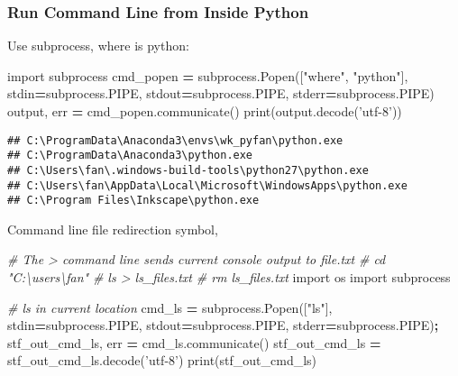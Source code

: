 \documentclass[
]{book}
\newenvironment{Shaded}{\begin{snugshade}}{\end{snugshade}}
\newcommand{\BuiltInTok}[1]{#1}
\newcommand{\CommentTok}[1]{\textcolor[rgb]{0.56,0.35,0.01}{\textit{#1}}}
\newcommand{\ImportTok}[1]{#1}
\newcommand{\NormalTok}[1]{#1}
\newcommand{\OperatorTok}[1]{\textcolor[rgb]{0.81,0.36,0.00}{\textbf{#1}}}
\newcommand{\StringTok}[1]{\textcolor[rgb]{0.31,0.60,0.02}{#1}}
\begin{document}
\hypertarget{run-command-line-from-inside-python}{%
\subsubsection{Run Command Line from Inside Python}\label{run-command-line-from-inside-python}}

Use subprocess, where is python:

\begin{Shaded}
\begin{Highlighting}[]
\ImportTok{import}\NormalTok{ subprocess}
\NormalTok{cmd_popen }\OperatorTok{=}\NormalTok{ subprocess.Popen([}\StringTok{"where"}\NormalTok{, }\StringTok{"python"}\NormalTok{],}
\NormalTok{                             stdin}\OperatorTok{=}\NormalTok{subprocess.PIPE,}
\NormalTok{                             stdout}\OperatorTok{=}\NormalTok{subprocess.PIPE,}
\NormalTok{                             stderr}\OperatorTok{=}\NormalTok{subprocess.PIPE)}
\NormalTok{output, err }\OperatorTok{=}\NormalTok{ cmd_popen.communicate()}
\BuiltInTok{print}\NormalTok{(output.decode(}\StringTok{'utf-8'}\NormalTok{))}
\end{Highlighting}
\end{Shaded}

\begin{verbatim}
## C:\ProgramData\Anaconda3\envs\wk_pyfan\python.exe
## C:\ProgramData\Anaconda3\python.exe
## C:\Users\fan\.windows-build-tools\python27\python.exe
## C:\Users\fan\AppData\Local\Microsoft\WindowsApps\python.exe
## C:\Program Files\Inkscape\python.exe
\end{verbatim}

Command line file redirection symbol,

\begin{Shaded}
\begin{Highlighting}[]
\CommentTok{# The > command line sends current console output to file.txt}
\CommentTok{# cd "C:\textbackslash{}users\textbackslash{}fan"}
\CommentTok{# ls > ls_files.txt}
\CommentTok{# rm ls_files.txt}
\ImportTok{import}\NormalTok{ os }
\ImportTok{import}\NormalTok{ subprocess }

\CommentTok{# ls in current location}
\NormalTok{cmd_ls }\OperatorTok{=}\NormalTok{ subprocess.Popen([}\StringTok{"ls"}\NormalTok{], stdin}\OperatorTok{=}\NormalTok{subprocess.PIPE, stdout}\OperatorTok{=}\NormalTok{subprocess.PIPE, stderr}\OperatorTok{=}\NormalTok{subprocess.PIPE)}\OperatorTok{;}
\NormalTok{stf_out_cmd_ls, err }\OperatorTok{=}\NormalTok{ cmd_ls.communicate()}
\NormalTok{stf_out_cmd_ls }\OperatorTok{=}\NormalTok{ stf_out_cmd_ls.decode(}\StringTok{'utf-8'}\NormalTok{)}
\BuiltInTok{print}\NormalTok{(stf_out_cmd_ls)}
\end{Highlighting}
\end{Shaded}
\end{document}
